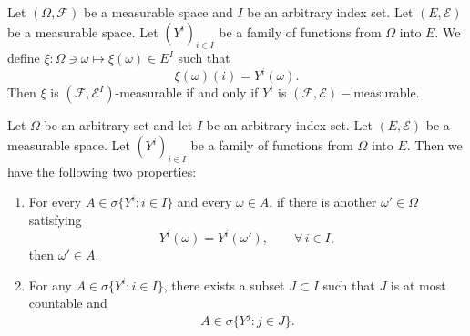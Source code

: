 \begin{lemma}
	Let $(\Omega, \mathcal{F})$ be a measurable space and $I$ be an arbitrary index set. Let $(E,\mathcal{E})$ be a measurable space. Let $(Y^i)_{i \in I}$ be a family of functions from $\Omega$ into $E$. We define $\xi : \Omega \ni \omega \mapsto \xi(\omega) \in E^I$ such that
	$$
	\xi(\omega)(i) = Y^i(\omega).
	$$
	Then $\xi$ is $(\mathcal{F},\mathcal{E}^I)$-measurable if and only if $Y^i$ is $(\mathcal{F}, \mathcal{E})-$measurable.
\end{lemma}

\begin{theorem}
	Let $\Omega$ be an arbitrary set and let $I$ be an arbitrary index set. Let $(E,\mathcal{E})$ be a measurable space. Let $(Y^i)_{i \in I}$ be a family of functions from $\Omega$ into $E$. Then we have the following two properties:
	\begin{enumerate}
		\item For every $A \in \sigma\{ Y^i: i\in I \}$ and every $\omega \in A$, if there is another $\omega' \in \Omega$ satisfying
		$$
			Y^i(\omega) = Y^i(\omega'), \qquad \forall \, i \in I,
		$$
		then $\omega' \in A$.
		\item For any $A \in \sigma\{Y^i: i \in I \}$, there exists a subset $J\subset I$ such that $J$ is at most countable and 
		$$
			A \in \sigma\{ Y^j: j \in J \}.
		$$
	\end{enumerate}
\end{theorem}

